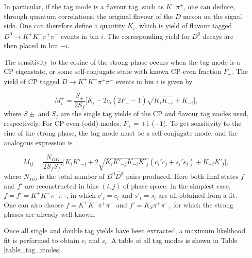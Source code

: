 \documentclass[12pt, a4paper, notitlepage, onecolumn]{article}
\numberwithin{equation}{section}
\begin{document}
In particular, if the tag mode is a flavour tag, such as $K^-\pi^+$, one can deduce, through quantum correlations, the original flavour of the $D$ meson on the signal side. One can therefore define a quantity $K_i$, which is yield of flavour tagged $D^0\to K^+K^-\pi^+\pi^-$ events in bin $i$. The corresponding yield for $\bar{D^0}$ decays are then placed in bin $-i$.

The sensitivity to the cosine of the strong phase occurs when the tag mode is a CP eigenstate, or some self-conjugate state with known CP-even fraction $F_+$. The yield of CP tagged $D\to K^+K^-\pi^+\pi^-$ events in bin $i$ is given by

\begin{equation}
  M_i^\pm = \frac{S_\pm}{2S_f}\Big[K_i - 2c_i(2F_+ - 1)\sqrt{K_iK_{-i}} + K_{-i}\Big],
  \label{eq_Mi}
\end{equation}
where $S\pm$ and $S_f$ are the single tag yields of the CP and flavour tag modes used, respectively. For CP even (odd) modes, $F_+ = +1$ ($-1$). To get sensitivity to the sine of the strong phase, the tag mode must be a self-conjugate mode, and the analogous expression is

\begin{equation}
  M_{ij} = \frac{N_{D\bar{D}}}{2S_fS_f'}\Big[K_iK'_{-j} + 2\sqrt{K_iK'_{-j}K_{-i}K'_j}(c_i'c_j + s_i's_j) + K_{-i}K'_j\Big],
  \label{eq_Mij}
\end{equation}
where $N_{D\bar{D}}$ is the total number of $D^0\bar{D^0}$ pairs produced. Here both final states $f$ and $f'$ are reconstructed in bins $(i, j)$ of phase space. In the simplest case, $f = f' = K^+K^-\pi^+\pi^-$, in which $c'_i = c_i$ and $s'_i = s_i$ are all obtained from a fit. One can also choose $f = K^+K^-\pi^+\pi^-$ and $f' = K_S\pi^+\pi^-$, for which the strong phases are already well known.

Once all single and double tag yields have been extracted, a maximum likelihood fit is performed to obtain $c_i$ and $s_i$. A table of all tag modes is shown in Table \ref{table_tag_modes}.
\end{document}
